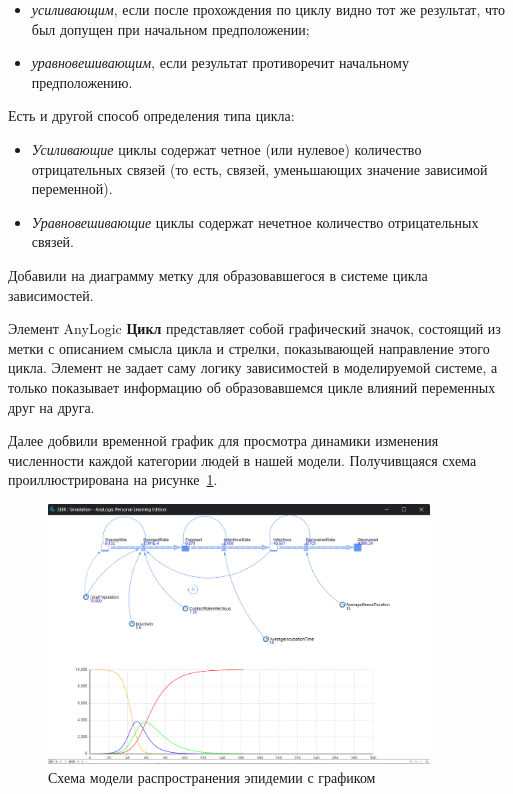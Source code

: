 \begin{itemize}
	\item \textit{усиливающим}, если после прохождения по циклу видно
		тот же результат, что был допущен при начальном предположении;
	\item \textit{уравновешивающим}, если результат противоречит начальному
		предположению.
\end{itemize}

Есть и другой способ определения типа цикла:

\begin{itemize}
	\item \textit{Усиливающие} циклы содержат четное (или нулевое) количество
		отрицательных связей (то есть, связей, уменьшающих значение
		зависимой переменной).
	\item \textit{Уравновешивающие} циклы содержат нечетное количество
		отрицательных связей.
\end{itemize}

Добавили на диаграмму метку для образовавшегося в системе цикла
зависимостей.\par
Элемент AnyLogic \textbf{Цикл} представляет собой графический значок,
состоящий из метки с описанием смысла цикла и стрелки, показывающей
направление этого цикла. Элемент не задает саму логику зависимостей
в моделируемой системе, а только показывает информацию об образовавшемся
цикле влияний переменных друг на друга.\par
Далее добвили временной график для просмотра динамики изменения
численности каждой категории людей в нашей модели.
Получивщаяся схема проиллюстрирована на рисунке~\ref{fig:epidemic:withGraph}.

\begin{figure}[h!tp]
	\centering
	\includegraphics[width=0.9\textwidth]{2023-03-18_17-05-56}
	\caption{Схема модели распространения эпидемии с графиком}
	\label{fig:epidemic:withGraph}
\end{figure}


